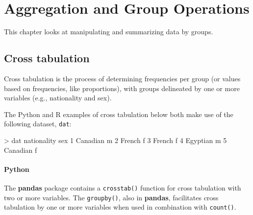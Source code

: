 \documentclass[
]{book}
\newenvironment{Shaded}{\begin{snugshade}}{\end{snugshade}}
\newcommand{\DecValTok}[1]{\textcolor[rgb]{0.00,0.00,0.81}{#1}}
\newcommand{\NormalTok}[1]{#1}
\newcommand{\SpecialCharTok}[1]{\textcolor[rgb]{0.00,0.00,0.00}{#1}}
\begin{document}
\hypertarget{aggregation-and-group-operations}{%
\chapter{Aggregation and Group Operations}\label{aggregation-and-group-operations}}

This chapter looks at manipulating and summarizing data by groups.

\hypertarget{cross-tabulation}{%
\section{Cross tabulation}\label{cross-tabulation}}

Cross tabulation is the process of determining frequencies per group (or values based on frequencies, like proportions), with groups delineated by one or more variables (e.g., nationality and sex).

The Python and R examples of cross tabulation below both make use of the following dataset, \texttt{dat}:

\begin{Shaded}
\begin{Highlighting}[]
\SpecialCharTok{\textgreater{}}\NormalTok{ dat}
\NormalTok{  nationality sex}
\DecValTok{1}\NormalTok{    Canadian   m}
\DecValTok{2}\NormalTok{      French   f}
\DecValTok{3}\NormalTok{      French   f}
\DecValTok{4}\NormalTok{    Egyptian   m}
\DecValTok{5}\NormalTok{    Canadian   f}
\end{Highlighting}
\end{Shaded}

\hypertarget{python-31}{%
\subsubsection*{Python}\label{python-31}}

The \textbf{pandas} package contains a \texttt{crosstab()} function for cross tabulation with two or more variables. The \texttt{groupby()}, also in \textbf{pandas}, facilitates cross tabulation by one or more variables when used in combination with \texttt{count()}.
\end{document}
